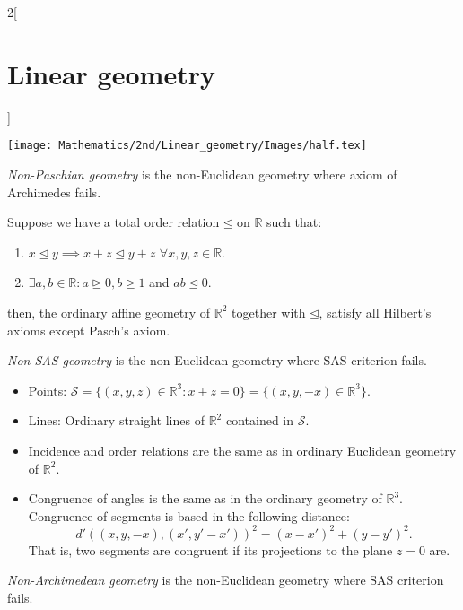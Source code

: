 \documentclass[class=article,10pt,crop=false]{standalone}
\begin{document}
\begin{multicols}{2}[\section{Linear geometry}]
\begin{definition}
\begin{itemize}
    \begin{minipage}{\linewidth} 
        \centering
        \texttt{[image: Mathematics/2nd/Linear\_geometry/Images/half.tex]} 
    \end{minipage} 
\end{itemize}
\end{definition}
\begin{definition}
\textit{Non-Paschian geometry} is the non-Euclidean geometry where axiom of Archimedes fails.
\end{definition}
\begin{prop}
Suppose we have a total order relation $\unlhd$ on $\mathbb{R}$ such that:
\begin{enumerate}
    \item $x\unlhd y\implies x+z\unlhd y+z$ $\forall x,y,z\in\mathbb{R}$.
    \item $\exists a,b\in\mathbb{R}: a\unrhd 0, b\unrhd 1$ and $ab\unlhd 0$.
\end{enumerate}
then, the ordinary affine geometry of $\mathbb{R}^2$ together with $\unlhd$, satisfy all Hilbert's axioms except Pasch's axiom.
\end{prop}
\begin{definition}
\textit{Non-SAS geometry} is the non-Euclidean geometry where SAS criterion fails.
\end{definition}
\begin{prop}
\hfill
\begin{itemize}
    \item Points: $\mathcal{S}=\{(x,y,z)\in\mathbb{R}^3:x+z=0\}=\{(x,y,-x)\in\mathbb{R}^3\}$.
    \item Lines: Ordinary straight lines of $\mathbb{R}^2$ contained in $\mathcal{S}$.
    \item Incidence and order relations are the same as in ordinary Euclidean geometry of $\mathbb{R}^2$.
    \item Congruence of angles is the same as in the ordinary geometry of $\mathbb{R}^3$. Congruence of segments is based in the following distance:  $$d'((x,y,-x),(x',y'-x'))^2=(x-x')^2+(y-y')^2.$$ That is, two segments are congruent if its projections to the plane $z=0$ are.
\end{itemize}
\end{prop}
\begin{definition}
\textit{Non-Archimedean geometry} is the non-Euclidean geometry where SAS criterion fails.
\end{definition}

\end{multicols}
\end{document}
